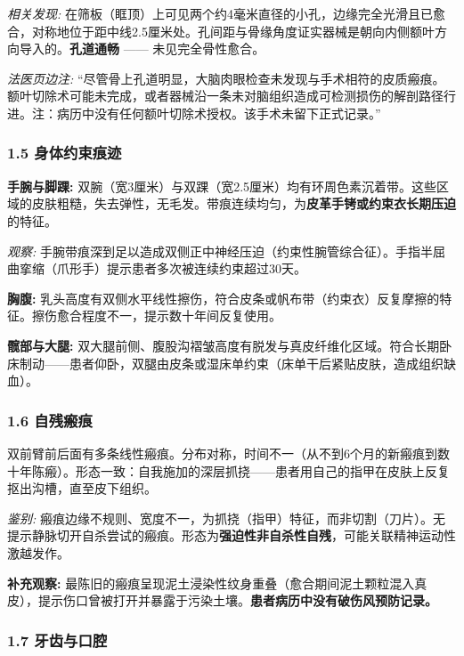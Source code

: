 \noindent \textit{相关发现:} 在筛板（眶顶）上可见两个约4毫米直径的小孔，边缘完全光滑且已愈合，对称地位于距中线2.5厘米处。孔间距与骨缘角度证实器械是朝向内侧额叶方向导入的。\textbf{孔道通畅} —— 未见完全骨性愈合。

\noindent \textit{法医页边注:} “尽管骨上孔道明显，大脑肉眼检查未发现与手术相符的皮质瘢痕。额叶切除术可能未完成，或者器械沿一条未对脑组织造成可检测损伤的解剖路径行进。注：病历中没有任何额叶切除术授权。该手术未留下正式记录。”

\subsubsection*{1.5 身体约束痕迹}

\noindent \textbf{手腕与脚踝:} 双腕（宽3厘米）与双踝（宽2.5厘米）均有环周色素沉着带。这些区域的皮肤粗糙，失去弹性，无毛发。带痕连续均匀，为\textbf{皮革手铐或约束衣长期压迫}的特征。

\noindent \textit{观察:} 手腕带痕深到足以造成双侧正中神经压迫（约束性腕管综合征）。手指半屈曲挛缩（爪形手）提示患者多次被连续约束超过30天。

\noindent \textbf{胸腹:} 乳头高度有双侧水平线性擦伤，符合皮条或帆布带（约束衣）反复摩擦的特征。擦伤愈合程度不一，提示数十年间反复使用。

\noindent \textbf{髋部与大腿:} 双大腿前侧、腹股沟褶皱高度有脱发与真皮纤维化区域。符合长期卧床制动——患者仰卧，双腿由皮条或湿床单约束（床单干后紧贴皮肤，造成组织缺血）。

\subsubsection*{1.6 自残瘢痕}

\noindent 双前臂前后面有多条线性瘢痕。分布对称，时间不一（从不到6个月的新瘢痕到数十年陈瘢）。形态一致：自我施加的深层抓挠——患者用自己的指甲在皮肤上反复抠出沟槽，直至皮下组织。

\noindent \textit{鉴别:} 瘢痕边缘不规则、宽度不一，为抓挠（指甲）特征，而非切割（刀片）。无提示静脉切开自杀尝试的瘢痕。形态为\textbf{强迫性非自杀性自残}，可能关联精神运动性激越发作。

\noindent \textbf{补充观察:} 最陈旧的瘢痕呈现泥土浸染性纹身重叠（愈合期间泥土颗粒混入真皮），提示伤口曾被打开并暴露于污染土壤。\textbf{患者病历中没有破伤风预防记录。}

\subsubsection*{1.7 牙齿与口腔}

